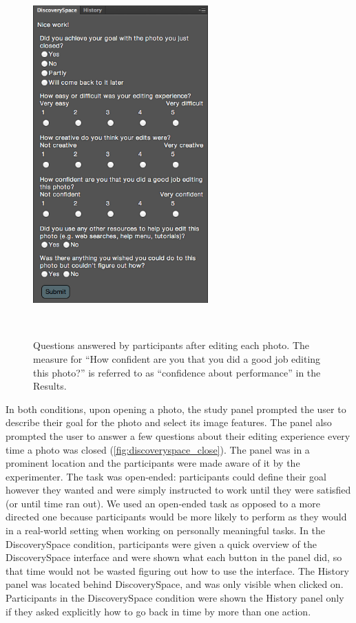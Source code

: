 \begin{figure}
\centering
  \includegraphics[width=0.6\textwidth]{discoveryspace/figures/close_questions.png}
  \caption{Questions answered by participants after editing each photo. The measure for ``How confident are you that you did a good job editing this photo?'' is referred to as ``confidence about performance'' in the Results.}~\label{fig:discoveryspace_close}
\end{figure}

In both conditions, upon opening a photo, the study panel prompted the user to describe their goal for the photo and select its image features. The panel also prompted the user to answer a few questions about their editing experience every time a photo was closed (\autoref{fig:discoveryspace_close}). The panel was in a prominent location and the participants were made aware of it by the experimenter. The task was open-ended: participants could define their goal however they wanted and were simply instructed to work until they were satisfied (or until time ran out).  We used an open-ended task as opposed to a more directed one because participants would be more likely to perform as they would in a real-world setting when working on personally meaningful tasks. In the Discovery\-Space condition, participants were given a quick overview of the Discovery\-Space interface and were shown what each button in the panel did, so that time would not be wasted figuring out how to use the interface. The History panel was located behind Discovery\-Space, and was only visible when clicked on. Participants in the Discovery\-Space condition were shown the History panel only if they asked explicitly how to go back in time by more than one action. 

